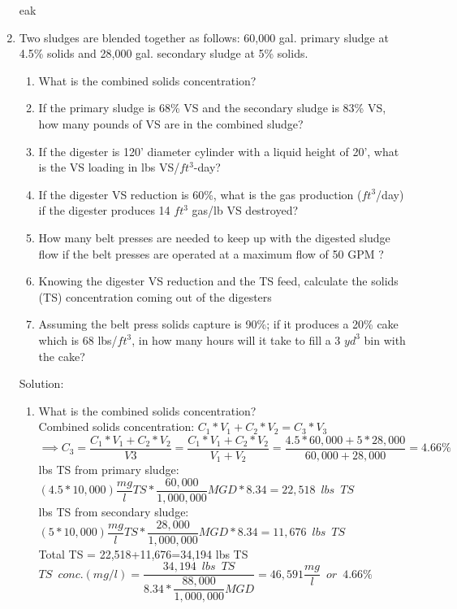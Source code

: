 \begin{enumerate}
eak
\item Two sludges are blended together as follows: 60,000 gal. primary sludge at 4.5\% solids and 28,000 gal. secondary sludge at 5\% solids. 
\begin{enumerate}
\item What is the combined solids concentration? 
\item If the primary sludge is 68\% VS and the secondary sludge is 83\% VS, how many pounds of VS are in the combined sludge? 
\item If the digester is 120’ diameter cylinder with a liquid height of 20’, what is the VS loading in lbs VS/$ft^3$-day?
\item If the digester VS reduction is 60\%, what is the gas production ($ft^3$/day) if the digester produces 14 $ft^3$ gas/lb VS destroyed?
\item How many belt presses are needed to keep up with the digested sludge flow if the belt presses are operated at a maximum flow of 50 GPM ?
\item Knowing the digester VS reduction and the TS feed, calculate the solids (TS) concentration coming out of the digesters
\item Assuming the belt press solids capture is 90\%; if it produces a 20\% cake which is 68 lbs/$ft^3$, in how many hours will it take to fill a 3 $yd^3$ bin with the cake?
\end{enumerate}
Solution:\\
\begin{enumerate}
\item What is the combined solids concentration?\\
Combined solids concentration:
$
C_1*V_1 + C_2*V_2 = C_3*V_3$\\
$\implies C_3 = \dfrac{C_1*V_1 + C_2*V_2}{V3}=\dfrac{C_1*V_1 + C_2*V_2}{V_1 + V_2}=\dfrac{4.5*60,000 + 5*28,000}{60,000 + 28,000}=\boxed{4.66\%}
$\\

lbs TS from primary sludge: $(4.5*10,000)\dfrac{mg}{l}TS*\dfrac{60,000}{1,000,000}MGD*8.34=22,518 \enspace lbs \enspace TS$\\
lbs TS from secondary sludge: $(5*10,000)\dfrac{mg}{l}TS*\dfrac{28,000}{1,000,000}MGD*8.34=11,676 \enspace lbs \enspace TS$\\
Total TS = 22,518+11,676=34,194 lbs TS\\
$TS \enspace conc.(mg/l) = \dfrac{34,194 \enspace lbs \enspace TS}{8.34*\dfrac{88,000}{1,000,000}MGD}=\boxed{46,591\dfrac{mg}{l} \enspace or \enspace 4.66\%}$


\end{enumerate}
\end{enumerate}
